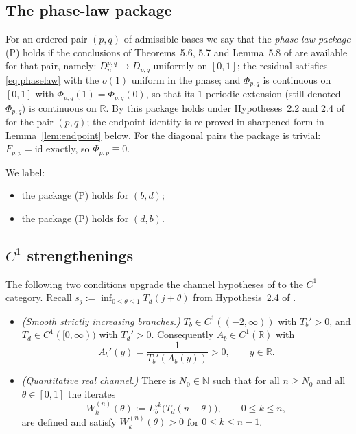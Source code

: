 \documentclass[11pt]{article}
\theoremstyle{definition}
\theoremstyle{remark}
\newcommand{\R}{\mathbb{R}}
\newcommand{\N}{\mathbb{N}}
\newcommand{\Lb}{L_{b}}
\newcommand{\Ab}{A_{b}}
\newcommand{\Tb}{T_{b}}
\newcommand{\Td}{T_{d}}
\begin{document}
\subsection{The phase-law package}
For an ordered pair $(p,q)$ of admissible bases we say that the
\emph{phase-law package} (P) holds if the conclusions of Theorems~5.6,
5.7 and Lemma~5.8 of \cite{J} are available for that pair, namely:
$D_n^{p,q}\to D_{p,q}$ uniformly on $[0,1]$; the residual satisfies
\eqref{eq:phaselaw} with the $o(1)$ uniform in the phase; and
$\Phi_{p,q}$ is continuous on $[0,1]$ with $\Phi_{p,q}(1)=\Phi_{p,q}(0)$,
so that its $1$-periodic extension (still denoted $\Phi_{p,q}$) is
continuous on $\R$. By \cite{J} this package holds under Hypotheses~2.2
and 2.4 of \cite{J} for the pair $(p,q)$; the endpoint identity is
re-proved in sharpened form in Lemma~\ref{lem:endpoint} below. For the
diagonal pairs the package is trivial: $F_{p,p}=\mathrm{id}$ exactly, so
$\Phi_{p,p}\equiv 0$.

We label:
\begin{itemize}
\item[\textup{(H1)}] the package (P) holds for $(b,d)$;
\item[\textup{(H2)}] the package (P) holds for $(d,b)$.
\end{itemize}

\subsection{$C^{1}$ strengthenings}
The following two conditions upgrade the channel hypotheses of \cite{J}
to the $C^{1}$ category. Recall $s_j:=\inf_{0\le\theta\le1}\Td(j+\theta)$
from Hypothesis~2.4 of \cite{J}.

\begin{itemize}
\item[\textup{(S)}] \emph{(Smooth strictly increasing branches.)}
$\Tb\in C^{1}((-2,\infty))$ with $\Tb'>0$, and
$\Td\in C^{1}([0,\infty))$ with $\Td'>0$. Consequently
$\Ab\in C^{1}(\R)$ with
\begin{equation}\label{eq:Abprime}
\Ab'(y)=\frac{1}{\Tb'(\Ab(y))}>0 ,\qquad y\in\R .
\end{equation}
\item[\textup{(R$'$)}] \emph{(Quantitative real channel.)} There is
$N_0\in\N$ such that for all $n\ge N_0$ and all $\theta\in[0,1]$ the
iterates
\[
W_k^{(n)}(\theta):=\Lb^{\circ k}\big(\Td(n+\theta)\big),
\qquad 0\le k\le n,
\]
are defined and satisfy $W_k^{(n)}(\theta)>0$ for $0\le k\le n-1$.
\end{itemize}
\end{document}
